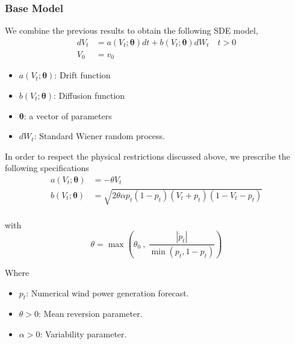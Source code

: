 \documentclass[aspectratio=169]{beamer}\usepackage[utf8]{inputenc}
\begin{document}
\begin{frame}\frametitle{ Base Model }
We combine  the previous results to obtain the following SDE model, 
\begin{equation}
\begin{split}
dV_t &= a(V_t; \bm{\theta}) dt + b (V_t; \bm{\theta} ) dW_t \quad t > 0 \\
V_0 & = v_0
\end{split}\label{main}
\end{equation}


\begin{itemize}
\item $a(V_t; \bm{\theta})$: Drift function 
\item $b (V_t; \bm{\theta} )$: Diffusion function 
\item $\bm{\theta}$: a vector of parameters
\item $dW_t$: Standard Wiener random process.
\end{itemize}
\end{frame}



\begin{frame}
In order to respect the physical restrictions discussed above, we prescribe the following specifications
\begin{equation}
\begin{split}
a(V_t; \bm{\theta}) &= - \theta V_t \\
b(V_t; \bm{\theta}) &=\sqrt{2 \theta \alpha p_t(1-p_t) (V_t +p_t ) (1-V_t-p_t)}  \\
\end{split}
\end{equation}

with
\begin{equation}
\theta = \max \left( \theta_0 \ , \ \frac{|\dot{p}_t|}{\min (p_t, 1-p_t)}  \right )
\end{equation}

Where 
\begin{itemize}
\item $p_t$: Numerical wind power generation forecast.
\item $\theta >0$: Mean reversion parameter.
\item $\alpha>0$: Variability parameter.
\end{itemize}
\end{frame}
\end{document}
